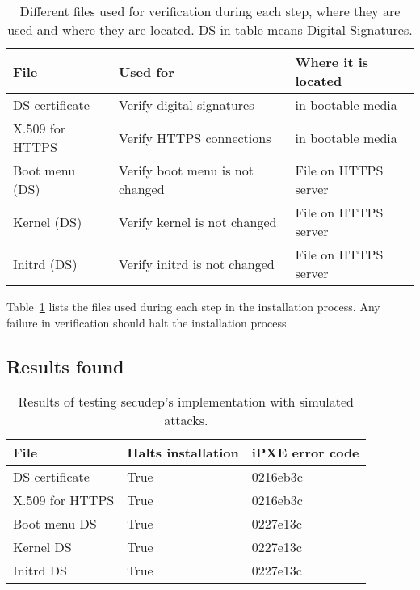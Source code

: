 \begin{table}[!ht]
  \def\arraystretch{1.1}%
  \begin{center}
    \caption{Different files used for verification during each step,
      where they are used and where they are located. DS in table
      means Digital Signatures.\label{tab:verification_files}}
    \begin{tabular}{| l | l | l |}
      \hline
      File            & Used for                        & Where it is located   \\
      \hline
      DS certificate  & Verify digital signatures       & in bootable media    \\
      X.509 for HTTPS & Verify HTTPS connections        & in bootable media    \\
      Boot menu (DS)  & Verify boot menu is not changed & File on HTTPS server \\
      Kernel (DS)     & Verify kernel is not changed    & File on HTTPS server \\
      Initrd (DS)     & Verify initrd is not changed    & File on HTTPS server \\
      \hline
    \end{tabular}
  \end{center}
\end{table}

Table~\ref{tab:verification_files} lists the files used during each
step in the installation process. Any failure in verification should
halt the installation process.


\subsection{Results found}

\begin{table}[!ht]
  \def\arraystretch{1.1}%
  \begin{center}
    \caption{Results of testing secudep's implementation with
      simulated attacks.\label{tab:mechanical_check_results}}
    \begin{tabular}{| l | l | l |}
      \hline
      File            & Halts installation & iPXE error code \\
      \hline
      DS certificate  & True               & 0216eb3c        \\
      X.509 for HTTPS & True               & 0216eb3c        \\
      Boot menu DS    & True               & 0227e13c        \\
      Kernel DS       & True               & 0227e13c        \\
      Initrd DS       & True               & 0227e13c        \\
      \hline
    \end{tabular}
  \end{center}
\end{table}

